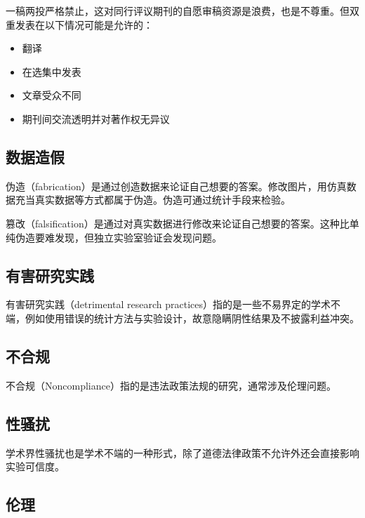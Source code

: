 \documentclass[]{tufte-book}
\providecommand{\tightlist}{%
  \setlength{\itemsep}{0pt}\setlength{\parskip}{0pt}}
\begin{document}
一稿两投严格禁止，这对同行评议期刊的自愿审稿资源是浪费，也是不尊重。但双重发表在以下情况可能是允许的：

\begin{itemize}
\tightlist
\item
  翻译
\item
  在选集中发表
\item
  文章受众不同
\item
  期刊间交流透明并对著作权无异议
\end{itemize}

\hypertarget{ux6570ux636eux9020ux5047}{%
\subsection{数据造假}\label{ux6570ux636eux9020ux5047}}

伪造（fabrication）是通过创造数据来论证自己想要的答案。修改图片，用仿真数据充当真实数据等方式都属于伪造。伪造可通过统计手段来检验。

篡改（falsification）是通过对真实数据进行修改来论证自己想要的答案。这种比单纯伪造要难发现，但独立实验室验证会发现问题。

\hypertarget{ux6709ux5bb3ux7814ux7a76ux5b9eux8df5}{%
\subsection{有害研究实践}\label{ux6709ux5bb3ux7814ux7a76ux5b9eux8df5}}

有害研究实践（detrimental research practices）指的是一些不易界定的学术不端，例如使用错误的统计方法与实验设计，故意隐瞒阴性结果及不披露利益冲突。

\hypertarget{ux4e0dux5408ux89c4}{%
\subsection{不合规}\label{ux4e0dux5408ux89c4}}

不合规（Noncompliance）指的是违法政策法规的研究，通常涉及伦理问题。

\hypertarget{ux6027ux9a9aux6270}{%
\subsection{性骚扰}\label{ux6027ux9a9aux6270}}

学术界性骚扰也是学术不端的一种形式，除了道德法律政策不允许外还会直接影响实验可信度。

\hypertarget{ux4f26ux7406}{%
\subsection{伦理}\label{ux4f26ux7406}}
\end{document}
